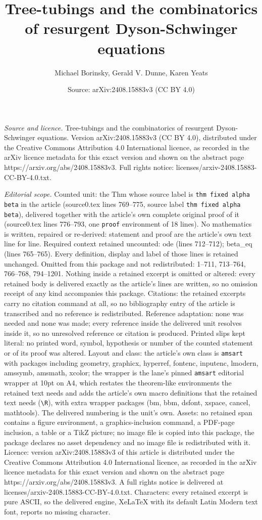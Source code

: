 \documentclass[10pt,a4paper]{amsart}
\title[Tree-tubings and the combinatorics of resurgent Dyson-Schwin]{Tree-tubings and the combinatorics of resurgent Dyson-Schwinger equations}
\author{Michael Borinsky, Gerald V. Dunne, Karen Yeats}
\date{Source: arXiv:2408.15883v3 (CC BY 4.0)}
\begin{document}
\maketitle

\noindent\emph{Source and licence.} Tree-tubings and the combinatorics of resurgent Dyson-Schwinger equations. Version arXiv:2408.15883v3 (CC BY 4.0), distributed under the Creative Commons Attribution 4.0 International licence, as recorded in the arXiv licence metadata for this exact version and shown on the abstract page https://arxiv.org/abs/2408.15883v3. Full rights notice: licenses/arxiv-2408.15883-CC-BY-4.0.txt.\par\smallskip

\noindent\textit{Editorial scope.} Counted unit: the Thm whose source label is \texttt{thm fixed alpha beta} in the article (source0.tex lines 769--775, source label \texttt{thm fixed alpha beta}), delivered together with the article's own complete original proof of it (source0.tex lines 776--793, one \texttt{proof} environment of 18 lines). No mathematics is written, repaired or re-derived: statement and proof are the article's own text line for line. Required context retained uncounted: ode (lines 712--712); beta\_eq (lines 765--765). Every definition, display and label of those lines is retained unchanged. Omitted from this package and not redistributed: 1--711, 713--764, 766--768, 794--1201. Nothing inside a retained excerpt is omitted or altered: every retained body is delivered exactly as the article's lines are written, so no omission receipt of any kind accompanies this package. Citations: the retained excerpts carry no citation command at all, so no bibliography entry of the article is transcribed and no reference is redistributed. Reference adaptation: none was needed and none was made; every reference inside the delivered unit resolves inside it, so no unresolved reference or citation is produced. Printed slips kept literal: no printed word, symbol, hypothesis or number of the counted statement or of its proof was altered. Layout and class: the article's own class is \texttt{amsart} with packages including geometry, graphicx, hyperref, fontenc, inputenc, lmodern, amssymb, amsmath, xcolor; the wrapper is the lane's pinned \texttt{amsart} editorial wrapper at 10pt on A4, which restates the theorem-like environments the retained text needs and adds the article's own macro definitions that the retained text needs (\texttt{\textbackslash R}), with extra wrapper packages (bm, bbm, dsfont, xspace, cancel, mathtools). The delivered numbering is the unit's own. Assets: no retained span contains a figure environment, a graphics-inclusion command, a PDF-page inclusion, a table or a TikZ picture; no image file is copied into this package, the package declares no asset dependency and no image file is redistributed with it. Licence: version arXiv:2408.15883v3 of this article is distributed under the Creative Commons Attribution 4.0 International licence, as recorded in the arXiv licence metadata for this exact version and shown on the abstract page https://arxiv.org/abs/2408.15883v3. A full rights notice is delivered at licenses/arxiv-2408.15883-CC-BY-4.0.txt. Characters: every retained excerpt is pure ASCII, so the delivered engine, XeLaTeX with its default Latin Modern text font, reports no missing character.
\end{document}
